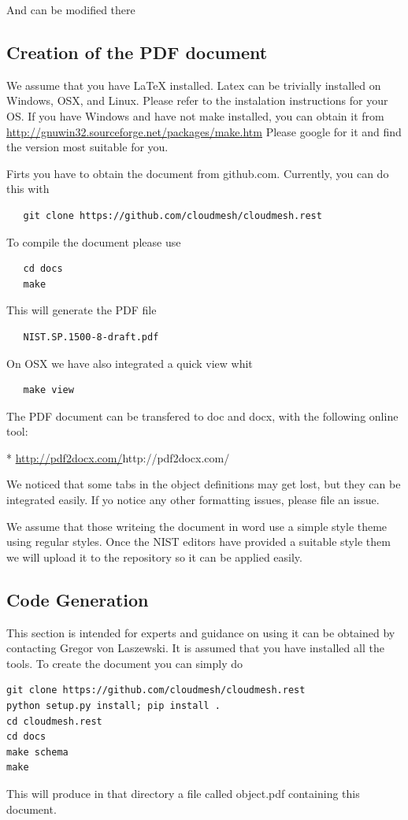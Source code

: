 \documentclass[10pt]{article}
\begin{document}
And can be modified there

\subsection{Creation of the PDF document}

We assume that you have LaTeX installed. Latex can be trivially
installed on Windows, OSX, and Linux. Please refer to the instalation
instructions for your OS. If you have Windows and have not make installed, you can
obtain it from \url{http://gnuwin32.sourceforge.net/packages/make.htm}
Please google for it and find the version most suitable for you.

Firts you have to obtain the document from github.com. Currently, you
can do this with 

\begin{verbatim}
   git clone https://github.com/cloudmesh/cloudmesh.rest
\end{verbatim}

To compile the document please use 

\begin{verbatim}
   cd docs
   make
\end{verbatim}

This will generate the PDF file 

\begin{verbatim}
   NIST.SP.1500-8-draft.pdf
\end{verbatim}

On OSX we have also integrated a quick view whit 

\begin{verbatim}
   make view
\end{verbatim}

The PDF document can be transfered to doc and docx, with the following
online tool:

* \url{http://pdf2docx.com/}{http://pdf2docx.com/}

We noticed that some tabs in the object definitions may get lost, but
they can be integrated easily. If yo notice any other formatting
issues, please file an issue.

We assume that those writeing the document in word use a simple style
theme using regular styles. Once the NIST editors have provided a
suitable style them we will upload it to the repository so it can be
applied easily.

\subsection{Code Generation}

This section is intended for experts and guidance on using it can be
obtained by contacting Gregor von Laszewski. It is assumed that you
have installed all the tools. To create the document you can simply do

\begin{Verbatim}
git clone https://github.com/cloudmesh/cloudmesh.rest
python setup.py install; pip install .
cd cloudmesh.rest
cd docs
make schema
make
\end{Verbatim}

This will produce in that directory a file called object.pdf
containing this document. 
\end{document}
